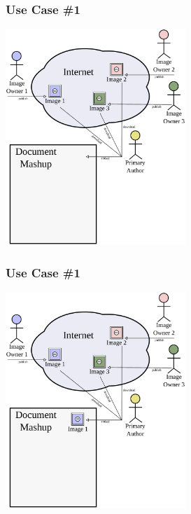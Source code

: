 \documentclass[mathserif,xcolor=dvipsnames,hyperref={bookmarks=true}]{beamer}
\begin{document}
    \begin{frame}[t]
        \frametitle{Use Case \#1}
        \begin{center}
            \includegraphics[width=0.51\textwidth]{../resources/usecases/usecase1/usecase1-step16.pdf}
        \end{center}
    \end{frame}
    \begin{frame}[t]
        \frametitle{Use Case \#1}
        \begin{center}
            \includegraphics[width=0.51\textwidth]{../resources/usecases/usecase1/usecase1-step17.pdf}
        \end{center}
    \end{frame}
\end{document}
